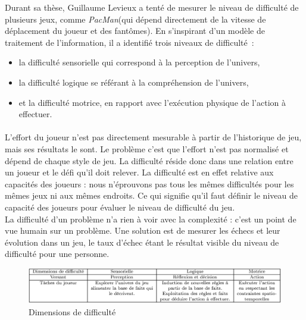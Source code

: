 Durant sa thèse, Guillaume Levieux\cite{Levi11} a tenté de mesurer le niveau de difficulté de plusieurs jeux, comme \emph{PacMan}(qui dépend directement de la vitesse de déplacement du joueur et des fantômes). En s’inspirant d’un modèle de traitement de l’information, il a identifié trois niveaux de difficulté~:
	\begin{itemize}
		\item la difficulté sensorielle qui correspond à la perception de l’univers,
		\item la difficulté logique se référant à la compréhension de l’univers,
		\item et la difficulté motrice, en rapport avec l'exécution physique de l’action à effectuer.
\end{itemize}
\paragraph{}L’effort du joueur n’est pas directement mesurable à partir de l’historique de jeu, mais ses résultats le sont. Le problème c’est que l’effort n’est pas normalisé et dépend de chaque style de jeu. La difficulté réside donc dans une relation entre un joueur et le défi qu’il doit relever. La difficulté est en effet relative aux capacités des joueurs : nous n’éprouvons pas tous les mêmes difficultés pour les mêmes jeux ni aux mêmes endroits. Ce qui signifie qu’il faut définir le niveau de capacité des joueurs pour évaluer le niveau de difficulté du jeu.\\
La difficulté d’un problème n’a rien à voir avec la complexité : c’est un point de vue humain sur un problème. Une solution est de mesurer les échecs et leur évolution dans un jeu, le taux d’échec étant le résultat visible du niveau de difficulté pour une personne.

\begin{figure}[!hbtp]
	\centering
	\includegraphics[width=\linewidth]{images/dimensions_difficulte.png}
	\caption{Dimensions de difficulté}
	\label{dimensions_difficulte}
\end{figure}

